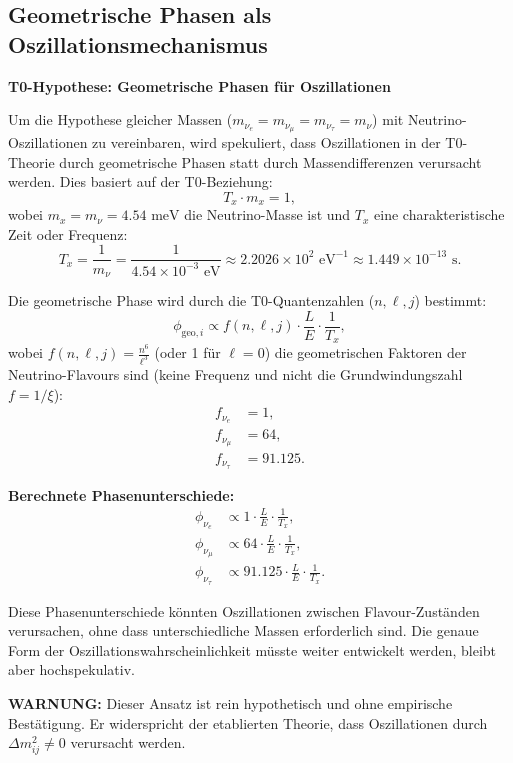 	\subsection{Geometrische Phasen als Oszillationsmechanismus}
	
	\begin{speculation}
		\textbf{T0-Hypothese: Geometrische Phasen für Oszillationen}
		
		Um die Hypothese gleicher Massen (\(m_{\nu_e} = m_{\nu_\mu} = m_{\nu_\tau} = m_\nu\)) mit Neutrino-Oszillationen zu vereinbaren, wird spekuliert, dass Oszillationen in der T0-Theorie durch geometrische Phasen statt durch Massendifferenzen verursacht werden. Dies basiert auf der T0-Beziehung:
		\[
		T_x \cdot m_x = 1,
		\]
		wobei \(m_x = m_\nu = 4.54 \text{ meV}\) die Neutrino-Masse ist und \(T_x\) eine charakteristische Zeit oder Frequenz:
		\[
		T_x = \frac{1}{m_\nu} = \frac{1}{4.54 \times 10^{-3} \text{ eV}} \approx 2.2026 \times 10^2 \text{ eV}^{-1} \approx 1.449 \times 10^{-13} \text{ s}.
		\]
		
		Die geometrische Phase wird durch die T0-Quantenzahlen (\(n, \ell, j\)) bestimmt:
		\[
		\phi_{\text{geo}, i} \propto f(n, \ell, j) \cdot \frac{L}{E} \cdot \frac{1}{T_x},
		\]
		wobei \(f(n, \ell, j) = \frac{n^6}{\ell^3}\) (oder 1 für \(\ell = 0\)) die geometrischen Faktoren der Neutrino-Flavours sind (keine Frequenz und nicht die Grundwindungszahl $f = 1/\xi$):
		\begin{align}
			f_{\nu_e} &= 1, \\
			f_{\nu_\mu} &= 64, \\
			f_{\nu_\tau} &= 91.125.
		\end{align}
		
		\textbf{Berechnete Phasenunterschiede:}
		\begin{align}
			\phi_{\nu_e} &\propto 1 \cdot \frac{L}{E} \cdot \frac{1}{T_x}, \\
			\phi_{\nu_\mu} &\propto 64 \cdot \frac{L}{E} \cdot \frac{1}{T_x}, \\
			\phi_{\nu_\tau} &\propto 91.125 \cdot \frac{L}{E} \cdot \frac{1}{T_x}.
		\end{align}
		
		Diese Phasenunterschiede könnten Oszillationen zwischen Flavour-Zuständen verursachen, ohne dass unterschiedliche Massen erforderlich sind. Die genaue Form der Oszillationswahrscheinlichkeit müsste weiter entwickelt werden, bleibt aber hochspekulativ.
		
		\textbf{WARNUNG:} Dieser Ansatz ist rein hypothetisch und ohne empirische Bestätigung. Er widerspricht der etablierten Theorie, dass Oszillationen durch \(\Delta m^2_{ij} \neq 0\) verursacht werden.
	\end{speculation}

